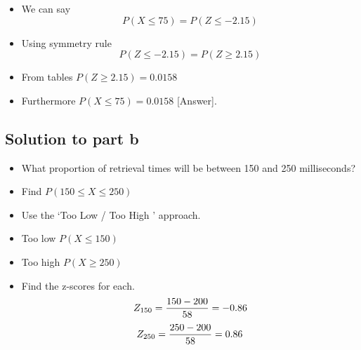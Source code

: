 \documentclass[a4paper,12pt]{article}
\begin{document}
	
	\begin{itemize}
		\item We can say
		\[ P( X \leq 75) = P( Z \leq -2.15)\]
		\item Using symmetry rule
		\[ P( Z \leq -2.15) = P( Z \geq 2.15)\]
		\item From tables $P( Z \geq 2.15) = 0.0158$
		\item Furthermore $P( X \leq 75) = \boldsymbol{0.0158}$ [Answer].
	\end{itemize}
				

\newpage	

	
	\subsection*{Solution to part b}
	\begin{itemize}
		\item What proportion of retrieval times will be between 150 and 250 milliseconds?
		\item Find $P(150 \leq X \leq 250)$
		\item Use the `Too Low / Too High ' approach.
		\item Too low $P( X \leq 150)$
		\item Too high $P( X \geq 250)$
		\item Find the z-scores for each.
		\[ Z_{150} =  {150 - 200 \over 58}  = -0.86 \]
		\[ Z_{250} =  {250 - 200 \over 58}  = 0.86 \]
	\end{itemize}
\end{document}
